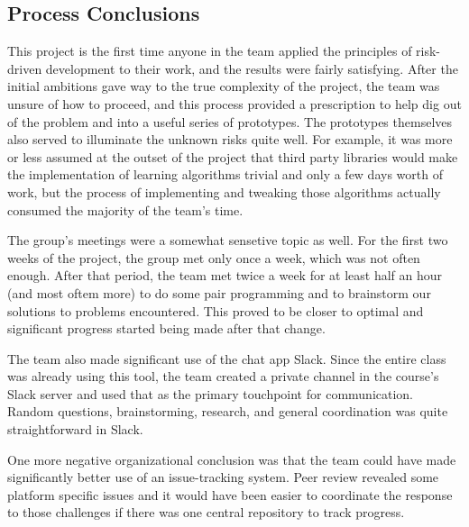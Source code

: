 
\subsection{Process Conclusions}
\label{sec:conc:process-conclusions}
This project is the first time anyone in the team applied the
principles of risk-driven development to their work, and the results
were fairly satisfying.
After the initial ambitions gave way to the true complexity of the
project, the team was unsure of how to proceed, and this process
provided a prescription to help dig out of the problem and into a
useful series of prototypes.
The prototypes themselves also served to illuminate the unknown risks
quite well.
For example, it was more or less assumed at the outset of the project
that third party libraries would make the implementation of learning
algorithms trivial and only a few days worth of work, but the process
of implementing and tweaking those algorithms actually consumed the
majority of the team's time.

The group's meetings were a somewhat sensetive topic as well.
For the first two weeks of the project, the group met only once a
week, which was not often enough.
After that period, the team met twice a week for at least half an hour
(and most oftem more) to do some pair programming and to brainstorm
our solutions to problems encountered.
This proved to be closer to optimal and significant progress started
being made after that change.

The team also made significant use of the chat app Slack.
Since the entire class was already using this tool, the team created a
private channel in the course's Slack server and used that as the
primary touchpoint for communication.
Random questions, brainstorming, research, and general coordination
was quite straightforward in Slack.

One more negative organizational conclusion was that the team could
have made significantly better use of an issue-tracking system.
Peer review revealed some platform specific issues and it would have
been easier to coordinate the response to those challenges if there
was one central repository to track progress.


